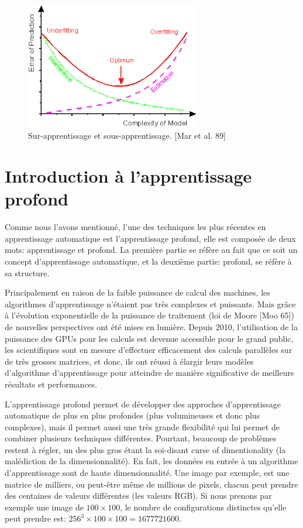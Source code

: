 \begin{figure}[H]
	\centering
		\includegraphics[width=3in]{Figures/image024.png}
	\caption[An Electron]{Sur-apprentissage et sous-apprentissage. [Mar et al. 89]}
	\label{fig:Electron}
\end{figure}


\section{Introduction à l'apprentissage profond}

	Comme nous l'avons mentionné, l'une des techniques les plus récentes en apprentissage automatique est l'apprentissage profond, elle est composée de deux mots: apprentissage et profond. La première partie se réfère au fait que ce soit un concept d'apprentissage automatique, et la deuxième partie: profond, se réfère à sa structure.

	Principalement en raison de la faible puissance de calcul des machines, les algorithmes d'apprentissage n'étaient pas très complexes et puissants. Mais grâce à l'évolution exponentielle de la puissance de traitement (loi de Moore [Moo 65]) de nouvelles perspectives ont été mises en lumière.
Depuis 2010, l'utilisation de la puissance des GPUs pour les calculs est devenue accessible pour le grand public, les scientifiques sont en mesure d'effectuer efficacement des calculs parallèles sur de très grosses matrices, et donc, ils ont réussi à élargir leurs modèles d'algorithme d'apprentissage pour atteindre de manière significative de meilleurs résultats et performances.

	L'apprentissage profond permet de développer des approches d'apprentissage automatique de plus en plus profondes (plus volumineuses et donc plus complexes), mais il permet aussi une très grande flexibilité qui lui permet de combiner plusieurs techniques différentes. Pourtant, beaucoup de problèmes restent à régler, un des plus gros étant la soi-disant curse of dimentionality (la malédiction de la dimensionnalité). En fait, les données en entrée à un algorithme d'apprentissage sont de haute dimensionnalité. Une image par exemple, est une matrice de milliers, ou peut-être même de millions de pixels, chacun peut prendre des centaines de valeurs différentes (les valeurs RGB). Si nous prenons par exemple une image de $100 \times 100$, le nombre de configurations distinctes qu'elle peut prendre est:
$256^{3} \times 100 \times 100 = 1 677 721 600$.

